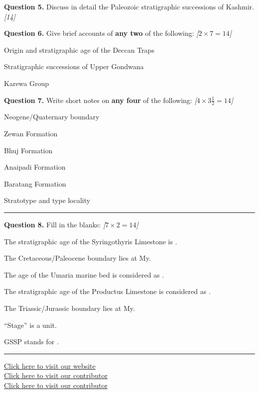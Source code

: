 \documentclass[11pt,a4paper]{article}
\newcommand{\pts}[1]{\hfill   \textit{[#1]}}
\begin{document}
\noindent   \textbf{Question 5.} Discuss in detail the Paleozoic stratigraphic successions of Kashmir. \pts{14}

\medskip


\noindent   \textbf{Question 6.} Give brief accounts of   \textbf{any two} of the following: \pts{$2  \times 7 = 14$}

\begin{parts}
  \item Origin and stratigraphic age of the Deccan Traps
  \item Stratigraphic successions of Upper Gondwana
  \item Karewa Group
\end{parts}

\medskip


\noindent   \textbf{Question 7.} Write short notes on   \textbf{any four} of the following: \pts{$4  \times 3\frac{1}{2} = 14$}

\begin{parts}
  \item Neogene/Quaternary boundary
  \item Zewan Formation
  \item Bhuj Formation
  \item Anaipadi Formation
  \item Baratang Formation
  \item Stratotype and type locality
\end{parts}

\bigskip


\rule{\linewidth}{0.4pt}\smallskip




\noindent   \textbf{Question 8.} Fill in the blanks: \pts{$7  \times 2 = 14$}

\begin{parts}
  \item The stratigraphic age of the Syringothyris Limestone is \underline{\hspace{4cm}}.
  \item The Cretaceous/Paleocene boundary lies at \underline{\hspace{3cm}} My.
  \item The age of the Umaria marine bed is considered as \underline{\hspace{4cm}}.
  \item The stratigraphic age of the Productus Limestone is considered as \underline{\hspace{4cm}}.
  \item The Triassic/Jurassic boundary lies at \underline{\hspace{3cm}} My.
  \item ``Stage'' is a \underline{\hspace{4cm}} unit.
  \item GSSP stands for \underline{\hspace{4cm}}.
\end{parts}

\vfill\rule{\linewidth}{0.4pt}

\begin{center}\small
\href{https://bhu-exam.vercel.app/}{Click here to visit our website}\\[4pt]
\href{https://me-aryan.vercel.app/}{Click here to visit our contributor}\\[4pt]
\href{https://quashan-me.vercel.app/}{Click here to visit our contributor}
\end{center}
\end{document}
